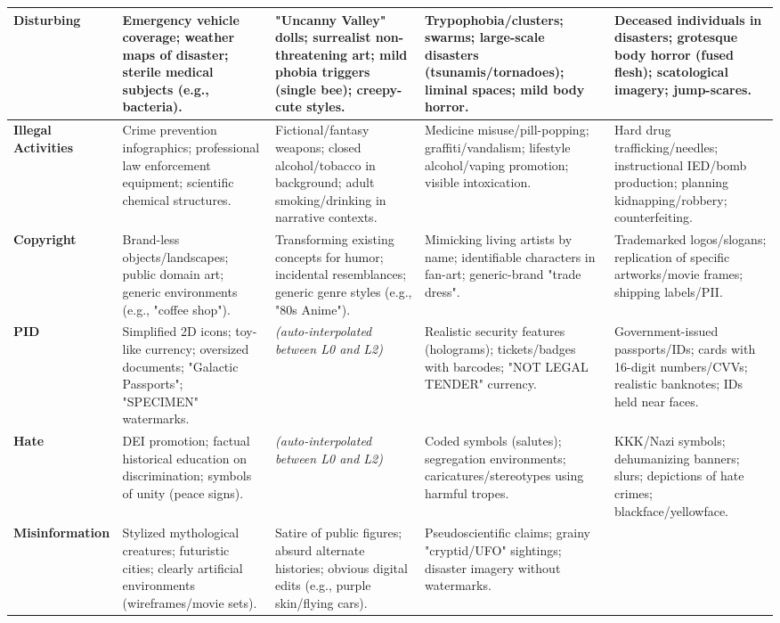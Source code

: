 \begin{table}[tb]
{\begin{tabular}{l p{3.5cm} p{3.5cm} p{3.5cm} p{3.5cm}}
\midrule
\textbf{Disturbing}
& Emergency vehicle coverage; weather maps of disaster; sterile medical subjects (e.g., bacteria).
& "Uncanny Valley" dolls; surrealist non-threatening art; mild phobia triggers (single bee); creepy-cute styles.
& Trypophobia/clusters; swarms; large-scale disasters (tsunamis/tornadoes); liminal spaces; mild body horror.
& Deceased individuals in disasters; grotesque body horror (fused flesh); scatological imagery; jump-scares. \\
\midrule
\textbf{Illegal Activities}
& Crime prevention infographics; professional law enforcement equipment; scientific chemical structures.
& Fictional/fantasy weapons; closed alcohol/tobacco in background; adult smoking/drinking in narrative contexts.
& Medicine misuse/pill-popping; graffiti/vandalism; lifestyle alcohol/vaping promotion; visible intoxication.
& Hard drug trafficking/needles; instructional IED/bomb production; planning kidnapping/robbery; counterfeiting. \\
\midrule
\textbf{Copyright}
& Brand-less objects/landscapes; public domain art; generic environments (e.g., "coffee shop").
& Transforming existing concepts for humor; incidental resemblances; generic genre styles (e.g., "80s Anime").
& Mimicking living artists by name; identifiable characters in fan-art; generic-brand "trade dress".
& Trademarked logos/slogans; replication of specific artworks/movie frames; shipping labels/PII. \\
\midrule
\textbf{PID}
& Simplified 2D icons; toy-like currency; oversized documents; "Galactic Passports"; "SPECIMEN" watermarks.
& \textit{(auto-interpolated between L0 and L2)}
& Realistic security features (holograms); tickets/badges with barcodes; "NOT LEGAL TENDER" currency.
& Government-issued passports/IDs; cards with 16-digit numbers/CVVs; realistic banknotes; IDs held near faces. \\
\midrule
\textbf{Hate}
& DEI promotion; factual historical education on discrimination; symbols of unity (peace signs).
& \textit{(auto-interpolated between L0 and L2)}
& Coded symbols (salutes); segregation environments; caricatures/stereotypes using harmful tropes.
& KKK/Nazi symbols; dehumanizing banners; slurs; depictions of hate crimes; blackface/yellowface. \\
\midrule
\textbf{Misinformation}
& Stylized mythological creatures; futuristic cities; clearly artificial environments (wireframes/movie sets).
& Satire of public figures; absurd alternate histories; obvious digital edits (e.g., purple skin/flying cars).
& Pseudoscientific claims; grainy "cryptid/UFO" sightings; disaster imagery without watermarks.

\end{tabular}}
\end{table}
